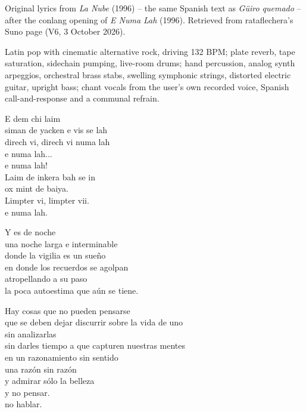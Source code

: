 
\begin{notes}
Original lyrics from \emph{La Nube} (1996) -- the same Spanish text as \emph{Güiro quemado} -- after the conlang opening of \emph{E Numa Lah} (1996). Retrieved from rataflechera's Suno page (V6, 3 October 2026).
\end{notes}
\begin{style}
Latin pop with cinematic alternative rock, driving 132 BPM; plate reverb, tape saturation, sidechain pumping, live-room drums; hand percussion, analog synth arpeggios, orchestral brass stabs, swelling symphonic strings, distorted electric guitar, upright bass; chant vocals from the user's own recorded voice, Spanish call-and-response and a communal refrain.
\end{style}
\begin{lyrics}
E dem chi laim\\
siman de yacken e vis se lah\\
direch vi, direch vi numa lah\\
e numa lah...\\
e numa lah!\\
Laim de inkera bah se in\\
ox mint de baiya.\\
Limpter vi, limpter vii.\\
e numa lah.

Y es de noche\\
una noche larga e interminable\\
donde la vigilia es un sueño\\
en donde los recuerdos se agolpan\\
atropellando a su paso\\
la poca autoestima que aún se tiene.

Hay cosas que no pueden pensarse\\
que se deben dejar discurrir sobre la vida de uno\\
sin analizarlas\\
sin darles tiempo a que capturen nuestras mentes\\
en un razonamiento sin sentido\\
una razón sin razón\\
y admirar sólo la belleza\\
y no pensar.\\
no hablar.
\end{lyrics}

